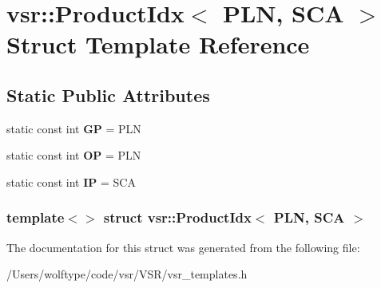 \hypertarget{structvsr_1_1_product_idx_3_01_p_l_n_00_01_s_c_a_01_4}{\section{vsr\-:\-:Product\-Idx$<$ P\-L\-N, S\-C\-A $>$ Struct Template Reference}
\label{structvsr_1_1_product_idx_3_01_p_l_n_00_01_s_c_a_01_4}
}
\subsection*{Static Public Attributes}
\begin{DoxyCompactItemize}
\item 
\hypertarget{structvsr_1_1_product_idx_3_01_p_l_n_00_01_s_c_a_01_4_a3ccc3f5d58a34cf133abea3877048dc2}{static const int {\bfseries G\-P} = P\-L\-N}\label{structvsr_1_1_product_idx_3_01_p_l_n_00_01_s_c_a_01_4_a3ccc3f5d58a34cf133abea3877048dc2}

\item 
\hypertarget{structvsr_1_1_product_idx_3_01_p_l_n_00_01_s_c_a_01_4_ae792d2f105bbd7adea8fab442322954b}{static const int {\bfseries O\-P} = P\-L\-N}\label{structvsr_1_1_product_idx_3_01_p_l_n_00_01_s_c_a_01_4_ae792d2f105bbd7adea8fab442322954b}

\item 
\hypertarget{structvsr_1_1_product_idx_3_01_p_l_n_00_01_s_c_a_01_4_ab5549a8f8907455baa18e7e7cb50a48a}{static const int {\bfseries I\-P} = S\-C\-A}\label{structvsr_1_1_product_idx_3_01_p_l_n_00_01_s_c_a_01_4_ab5549a8f8907455baa18e7e7cb50a48a}

\end{DoxyCompactItemize}
\subsubsection*{template$<$$>$ struct vsr\-::\-Product\-Idx$<$ P\-L\-N, S\-C\-A $>$}



The documentation for this struct was generated from the following file\-:\begin{DoxyCompactItemize}
\item 
/\-Users/wolftype/code/vsr/\-V\-S\-R/vsr\-\_\-templates.\-h\end{DoxyCompactItemize}
